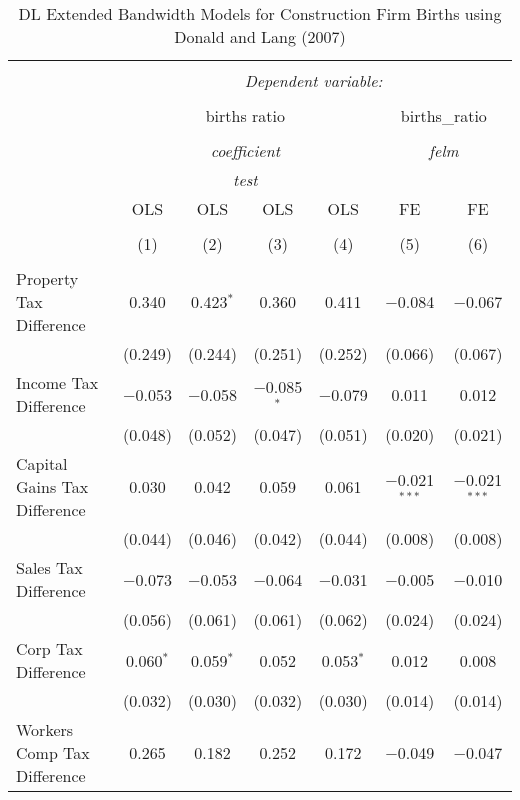 
\begin{table}[!htbp] \centering 
  \caption{DL Extended Bandwidth Models for  Construction Firm Births using Donald and Lang (2007)} 
  \label{} 
\begin{tabular}{@{\extracolsep{5pt}}lcccccc} 
\\[-1.8ex]\hline 
\hline \\[-1.8ex] 
 & \multicolumn{6}{c}{\textit{Dependent variable:}} \\ 
\cline{2-7} 
\\[-1.8ex] & \multicolumn{4}{c}{births ratio} & \multicolumn{2}{c}{births\_ratio} \\ 
\\[-1.8ex] & \multicolumn{4}{c}{\textit{coefficient}} & \multicolumn{2}{c}{\textit{felm}} \\ 
 & \multicolumn{4}{c}{\textit{test}} & \multicolumn{2}{c}{\textit{}} \\ 
 & OLS & OLS & OLS & OLS & FE & FE \\ 
\\[-1.8ex] & (1) & (2) & (3) & (4) & (5) & (6)\\ 
\hline \\[-1.8ex] 
 Property Tax Difference & 0.340 & 0.423$^{*}$ & 0.360 & 0.411 & $-$0.084 & $-$0.067 \\ 
  & (0.249) & (0.244) & (0.251) & (0.252) & (0.066) & (0.067) \\ 
  Income Tax Difference & $-$0.053 & $-$0.058 & $-$0.085$^{*}$ & $-$0.079 & 0.011 & 0.012 \\ 
  & (0.048) & (0.052) & (0.047) & (0.051) & (0.020) & (0.021) \\ 
  Capital Gains Tax Difference & 0.030 & 0.042 & 0.059 & 0.061 & $-$0.021$^{***}$ & $-$0.021$^{***}$ \\ 
  & (0.044) & (0.046) & (0.042) & (0.044) & (0.008) & (0.008) \\ 
  Sales Tax Difference & $-$0.073 & $-$0.053 & $-$0.064 & $-$0.031 & $-$0.005 & $-$0.010 \\ 
  & (0.056) & (0.061) & (0.061) & (0.062) & (0.024) & (0.024) \\ 
  Corp Tax Difference & 0.060$^{*}$ & 0.059$^{*}$ & 0.052 & 0.053$^{*}$ & 0.012 & 0.008 \\ 
  & (0.032) & (0.030) & (0.032) & (0.030) & (0.014) & (0.014) \\ 
  Workers Comp Tax Difference & 0.265 & 0.182 & 0.252 & 0.172 & $-$0.049 & $-$0.047 \\ 

\end{tabular}
\end{table}
